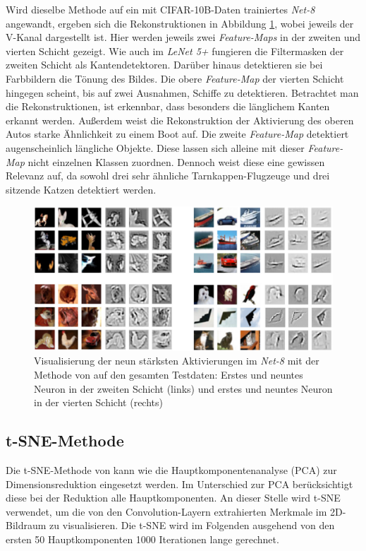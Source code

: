 Wird dieselbe Methode auf ein mit CIFAR-10B-Daten trainiertes \textit{Net-8} angewandt, ergeben sich die Rekonstruktionen in Abbildung \ref{fig:6_vis_cifar}, wobei jeweils der V-Kanal dargestellt ist. Hier werden jeweils zwei \textit{Feature-Maps} in der zweiten und vierten Schicht gezeigt. Wie auch im \textit{LeNet 5+} fungieren die Filtermasken der zweiten Schicht als Kantendetektoren. Darüber hinaus detektieren sie bei Farbbildern die Tönung des Bildes. Die obere \textit{Feature-Map} der vierten Schicht hingegen scheint, bis auf zwei Ausnahmen, Schiffe zu detektieren. Betrachtet man die Rekonstruktionen, ist erkennbar, dass besonders die länglichem Kanten erkannt werden. Außerdem weist die Rekonstruktion der Aktivierung des oberen Autos starke Ähnlichkeit zu einem Boot auf. Die zweite \textit{Feature-Map} detektiert augenscheinlich längliche Objekte. Diese lassen sich alleine mit dieser \textit{Feature-Map} nicht einzelnen Klassen zuordnen. Dennoch weist diese eine gewissen Relevanz auf, da sowohl drei sehr ähnliche Tarnkappen-Flugzeuge und drei sitzende Katzen detektiert werden. 

\begin{figure}
\centering
\includegraphics[width=1.0\linewidth]{images/6_visualize_cifar}
\caption[]{Visualisierung der neun stärksten Aktivierungen im \textit{Net-8}  mit der Methode von \cite{Zeiler2014} auf den gesamten Testdaten: Erstes und neuntes Neuron in der zweiten Schicht (links) und erstes und neuntes Neuron in der vierten Schicht (rechts)}
\label{fig:6_vis_cifar}
\end{figure}


\subsection{t-SNE-Methode}
Die t-SNE-Methode von \cite{Laurens2008} kann wie die Hauptkomponentenanalyse (PCA) zur Dimensionsreduktion eingesetzt werden. Im Unterschied zur PCA berücksichtigt diese bei der Reduktion alle Hauptkomponenten. An dieser Stelle wird t-SNE verwendet, um die von den Convolution-Layern extrahierten Merkmale im 2D-Bildraum zu visualisieren. Die t-SNE wird im Folgenden ausgehend von den ersten 50 Hauptkomponenten 1000 Iterationen lange gerechnet.

